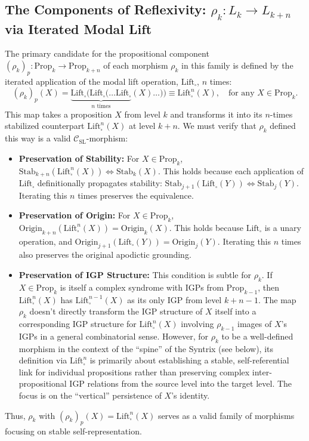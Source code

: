 \documentclass[
    12pt,              %
    a4paper,           %
    headings=normal,   %
    twoside=true,      %
    BCOR=8mm,          %
]{scrbook}
\newcommand{\q}[1]{\enquote{#1}}
\newcommand{\BoxSyn}{\square}
\begin{document}
\subsection{The Components of Reflexivity: \(\rho_k: L_k \to L_{k+n}\) via Iterated Modal Lift}
\label{sec:ch2_reflexivity_components_lift} 
The primary candidate for the propositional component \((\rho_k)_p: \text{Prop}_k \to \text{Prop}_{k+n}\) of each morphism \(\rho_k\) in this family is defined by the iterated application of the modal lift operation, \(\text{Lift}_\BoxSyn\), \(n\) times:
\[ (\rho_k)_p(X) = \underbrace{\text{Lift}_\BoxSyn(\text{Lift}_\BoxSyn(\ldots \text{Lift}_\BoxSyn}_{n \text{ times}}(X)\ldots)) \equiv \text{Lift}_\BoxSyn^n(X), \quad \text{for any } X \in \text{Prop}_k. \]
This map takes a proposition \(X\) from level \(k\) and transforms it into its \(n\)-times stabilized counterpart \(\text{Lift}_\BoxSyn^n(X)\) at level \(k+n\). We must verify that \(\rho_k\) defined this way is a valid \(\mathcal{C}_{\text{SL}}\)-morphism:
\begin{itemize}
    \item   \textbf{Preservation of Stability:} For \(X \in \text{Prop}_k\), \(\text{Stab}_{k+n}(\text{Lift}_\BoxSyn^n(X)) \iff \text{Stab}_k(X)\). This holds because each application of \(\text{Lift}_\BoxSyn\) definitionally propagates stability: \(\text{Stab}_{j+1}(\text{Lift}_\BoxSyn(Y)) \iff \text{Stab}_j(Y)\). Iterating this \(n\) times preserves the equivalence.
    \item   \textbf{Preservation of Origin:} For \(X \in \text{Prop}_k\), \(\text{Origin}_{k+n}(\text{Lift}_\BoxSyn^n(X)) = \text{Origin}_k(X)\). This holds because \(\text{Lift}_\BoxSyn\) is a unary operation, and \(\text{Origin}_{j+1}(\text{Lift}_\BoxSyn(Y)) = \text{Origin}_j(Y)\). Iterating this \(n\) times also preserves the original apodictic grounding.
    \item   \textbf{Preservation of IGP Structure:} This condition is subtle for \(\rho_k\). If \(X \in \text{Prop}_k\) is itself a complex syndrome with IGPs from \(\text{Prop}_{k-1}\), then \(\text{Lift}_\BoxSyn^n(X)\) has \(\text{Lift}_\BoxSyn^{n-1}(X)\) as its only IGP from level \(k+n-1\). The map \(\rho_k\) doesn't directly transform the IGP structure of \(X\) itself into a corresponding IGP structure for \(\text{Lift}_\BoxSyn^n(X)\) involving \(\rho_{k-1}\) images of \(X\)'s IGPs in a general combinatorial sense. However, for \(\rho_k\) to be a well-defined morphism in the context of the \q{spine} of the Syntrix (see below), its definition via \(\text{Lift}_\BoxSyn^n\) is primarily about establishing a stable, self-referential link for individual propositions rather than preserving complex inter-propositional IGP relations from the source level into the target level. The focus is on the \q{vertical} persistence of \(X\)'s identity.
\end{itemize}
Thus, \(\rho_k\) with \((\rho_k)_p(X) = \text{Lift}_\BoxSyn^n(X)\) serves as a valid family of morphisms focusing on stable self-representation.
\end{document}
